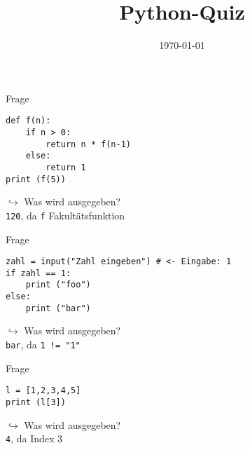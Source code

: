 



\title{Python-Quiz}
\date{\today}

\usepackage{tikz} \usetikzlibrary{arrows, positioning}





\maketitle


\begin{frame}[fragile]{Frage }
    \begin{lstlisting}
def f(n):
    if n > 0:
        return n * f(n-1)
    else:
        return 1
print (f(5))
    \end{lstlisting}
    $\hookrightarrow$ Was wird ausgegeben?\\
    \pause
    \texttt{120}, da \texttt{f} Fakultätsfunktion
\end{frame}


\begin{frame}[fragile]{Frage }
    \begin{lstlisting}
zahl = input("Zahl eingeben") # <- Eingabe: 1
if zahl == 1:
    print ("foo")
else:
    print ("bar")
    \end{lstlisting}
    $\hookrightarrow$ Was wird ausgegeben?\\
    \pause
    \texttt{bar}, da \texttt{1 != "1"}
\end{frame}


\begin{frame}[fragile]{Frage }
    \begin{lstlisting}
l = [1,2,3,4,5]
print (l[3])
    \end{lstlisting}
    $\hookrightarrow$ Was wird ausgegeben?\\
    \pause
    \texttt{4}, da Index 3
\end{frame}

